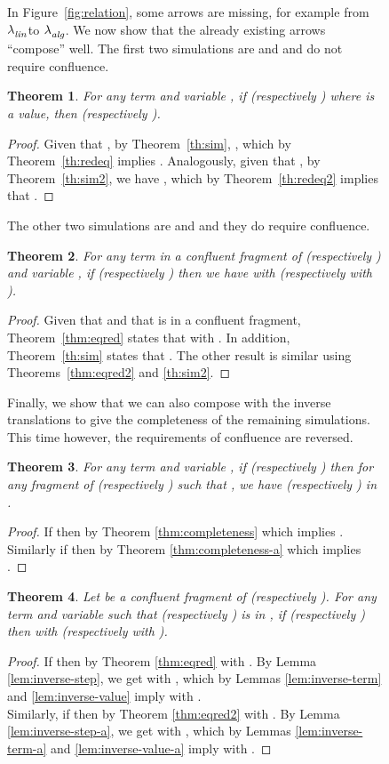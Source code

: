 \documentclass{LMCS}
\newtheorem{theorem}{Theorem}[section]
\newcommand{\xllin}[1]{\ensuremath{\lambda^{\raisebox{0.5ex}{\textrm{\tiny }}}_{{\it lin}}}}
\newcommand{\xlalg}[1]{\ensuremath{\lambda^{\raisebox{0.5ex}{\textrm{\tiny }}}_{{\it alg}}}}
\newcommand{\llinred}{\xllin{\rightarrow}}
\newcommand{\lalgeq}{\xlalg{=}}
\begin{document}
\begin{figure}
{In Figure~\ref{fig:relation}, some arrows are missing, for example from \llinred to \lalgeq. We now show that the already existing arrows ``compose'' well. The first two simulations are  and  and do not require confluence.
\begin{theorem}
  For any term  and variable ,
  if  (respectively ) where  is a value, then  (respectively ).
\end{theorem}
\begin{proof}
  Given that , by Theorem~\ref{th:sim}, , which by Theorem~\ref{th:redeq} implies .
  Analogously, given that , by Theorem~\ref{th:sim2}, we have
  , which by
  Theorem~\ref{th:redeq2} implies that   .
\end{proof}


The other two simulations are  and
 and they do require confluence.
\begin{theorem}
  For any term  in a confluent fragment of 
  (respectively ) and variable , if  (respectively ) then we have
   with  
  (respectively  with  ).
\end{theorem}
\begin{proof}
  Given that  and that  is in a confluent fragment, Theorem~\ref{thm:eqred} states that  with . In addition, Theorem~\ref{th:sim} states that .  
  The other result is similar using
  Theorems~\ref{thm:eqred2} and \ref{th:sim2}. 
\end{proof}

Finally, we show that we can also compose with the
inverse translations to give the completeness of the remaining simulations.
This time however, the requirements of confluence are reversed.

\begin{theorem}
  For any term  and variable , if  (respectively )
  then for any fragment  of  (respectively )
  such that , we have  (respectively ) in .\end{theorem}
\begin{proof}
  If  then by Theorem \ref{thm:completeness}
   which implies . Similarly if 
  then by Theorem \ref{thm:completeness-a}  which
  implies .\end{proof}

\begin{theorem}
  Let  be a confluent fragment of  (respectively ).
  For any term  and variable  such that  (respectively )
  is in , if  (respectively )
  then  with  (respectively 
  with ).\end{theorem}
\begin{proof}
  If  then by Theorem \ref{thm:eqred}
   with . By Lemma \ref{lem:inverse-step},
  we get 
  with , which by Lemmas \ref{lem:inverse-term}
  and \ref{lem:inverse-value} imply  with
  .\\
  Similarly, if  then by Theorem \ref{thm:eqred2}
   with . By Lemma \ref{lem:inverse-step-a},
  we get 
  with , which by Lemmas \ref{lem:inverse-term-a}
  and \ref{lem:inverse-value-a} imply 
  with .
\end{proof}


}
\end{figure}
\end{document}
